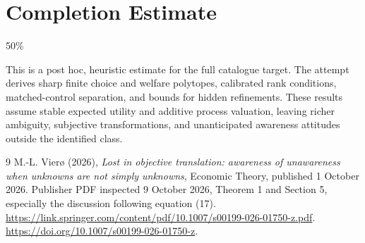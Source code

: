 \documentclass[11pt]{article}
\theoremstyle{remark}
\begin{document}
\section{Completion Estimate}
50\%

This is a post hoc, heuristic estimate for the full catalogue target.
The attempt derives sharp finite choice and welfare polytopes, calibrated rank conditions, matched-control separation, and bounds for hidden refinements. These results assume stable expected utility and additive process valuation, leaving richer ambiguity, subjective transformations, and unanticipated awareness attitudes outside the identified class.

\begin{thebibliography}{9}
 M.-L. Vier\o{} (2026), \emph{Lost in objective translation: awareness of unawareness when unknowns are not simply unknowns}, Economic Theory, published 1 October 2026. Publisher PDF inspected 9 October 2026, Theorem 1 and Section 5, especially the discussion following equation (17). \url{https://link.springer.com/content/pdf/10.1007/s00199-026-01750-z.pdf}. \url{https://doi.org/10.1007/s00199-026-01750-z}.
\end{thebibliography}
\end{document}
